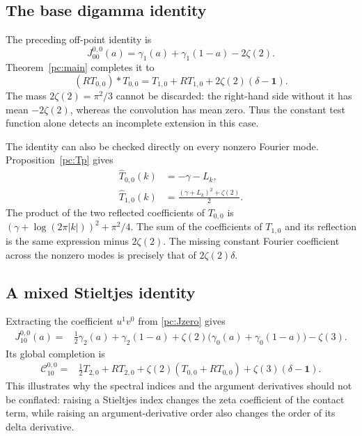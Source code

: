 \documentclass[11pt,a4paper]{article}
\numberwithin{equation}{section}
\theoremstyle{definition}
\newcommand{\CC}{\mathcal C}
\newcommand{\one}{\mathbf 1}
\begin{document}
\subsection{The base digamma identity}
The preceding off-point identity is
\begin{equation}\label{pc:J00}
J_{00}^{0,0}(a)=\gamma_1(a)+\gamma_1(1-a)-2\zeta(2).
\end{equation}
Theorem~\ref{pc:main} completes it to
\begin{equation}\label{pc:C00}
\boxed{\quad
(RT_{0,0})*T_{0,0}=T_{1,0}+RT_{1,0}
+2\zeta(2)(\delta-\one).
\quad}
\end{equation}
The mass $2\zeta(2)=\pi^2/3$ cannot be discarded: the right-hand side without it has mean $-2\zeta(2)$, whereas the convolution has mean zero. Thus the constant test function alone detects an incomplete extension in this case.

The identity can also be checked directly on every nonzero Fourier mode. Proposition~\ref{pc:Tp} gives
\begin{align}
\widehat T_{0,0}(k)&=-\gamma-L_k,\label{pc:T0mode}\\
\widehat T_{1,0}(k)&=\frac{(\gamma+L_k)^2+\zeta(2)}2.\label{pc:T1mode}
\end{align}
The product of the two reflected coefficients of $T_{0,0}$ is
$(\gamma+\log(2\pi|k|))^2+\pi^2/4$. The sum of the coefficients of $T_{1,0}$ and its reflection is the same expression minus $2\zeta(2)$. The missing constant Fourier coefficient across the nonzero modes is precisely that of $2\zeta(2)\delta$.

\subsection{A mixed Stieltjes identity}
Extracting the coefficient $u^1v^0$ from \eqref{pc:Jzero} gives
\begin{align}
J_{10}^{0,0}(a)={}&\tfrac12\gamma_2(a)+\gamma_2(1-a)
+\zeta(2)\big(\gamma_0(a)+\gamma_0(1-a)\big)-\zeta(3).\label{pc:J10}
\end{align}
Its global completion is
\begin{align}
\CC_{10}^{0,0}={}&\tfrac12T_{2,0}+RT_{2,0}
+\zeta(2)(T_{0,0}+RT_{0,0})+\zeta(3)(\delta-\one).\label{pc:C10}
\end{align}
This illustrates why the spectral indices and the argument derivatives should not be conflated: raising a Stieltjes index changes the zeta coefficient of the contact term, while raising an argument-derivative order also changes the order of its delta derivative.
\end{document}
